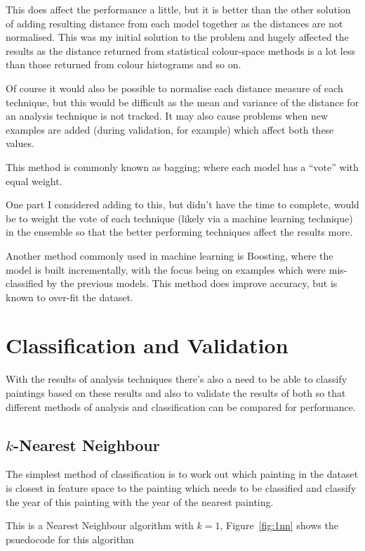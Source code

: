 This does affect the performance a little, but it is better than the other solution of adding 
resulting distance from each model together as the distances are not normalised. This was my 
initial solution to the problem and hugely affected the results as the distance returned from
statistical colour-space methods is a lot less than those returned from colour histograms and so
on.

Of course it would also be possible to normalise each distance measure of each technique, but this
would be difficult as the mean and variance of the distance for an analysis technique is not 
tracked. It may also cause problems when new examples are added (during validation, for example)
which affect both these values.

This method is commonly known as \gls{bagging}; where each model has a ``vote'' with equal weight.

One part I considered adding to this, but didn't have the time to complete, would be to weight the
vote of each technique (likely via a machine learning technique) in the ensemble so that the 
better performing techniques affect the results more.

Another method commonly used in machine learning is Boosting, where the model is built 
incrementally, with the focus being on examples which were mis-classified by the previous models.
This method does improve accuracy, but is known to over-fit the dataset. 


\section{Classification and Validation}
With the results of analysis techniques there's also a need to be able to classify paintings based
on these results and also to validate the results of both so that different methods of analysis
and classification can be compared for performance.

\subsection{$k$-Nearest Neighbour}
The simplest method of classification is to work out which painting in the dataset is closest in
feature space to the painting which needs to be classified and classify the year of this painting
with the year of the nearest painting.

This is a Nearest Neighbour algorithm with $k=1$, Figure~\ref{fig:1nn} shows the psuedocode
for this algorithm


